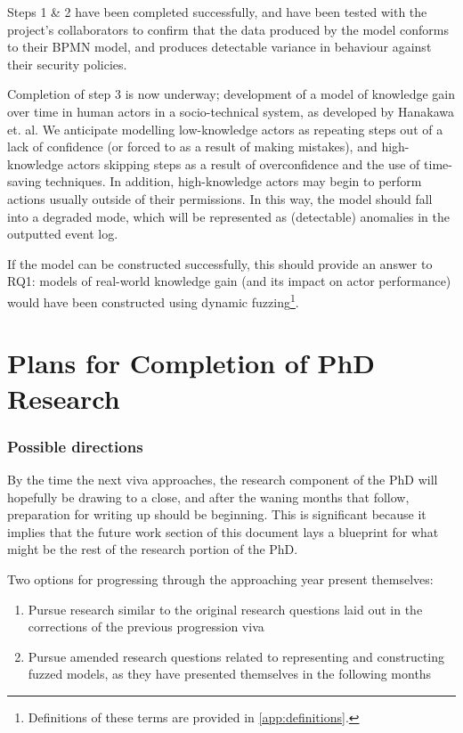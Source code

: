\documentclass[11pt]{article}
\newcommand{\ampersand}{\&}
\begin{document}
Steps 1 \ampersand{} 2 have been completed successfully, and have been tested with the
project's collaborators to confirm that the data produced by the model conforms
to their BPMN model, and produces detectable variance in behaviour against their
security policies.

Completion of step 3 is now underway; development of a model of knowledge gain
over time in human actors in a socio-technical system, as developed by Hanakawa
et. al\cite{hanakawa}. We anticipate modelling low-knowledge actors as repeating
steps out of a lack of confidence (or forced to as a result of making mistakes),
and high-knowledge actors skipping steps as a result of overconfidence and the
use of time-saving techniques. In addition, high-knowledge actors may begin to
perform actions usually outside of their permissions. In this way, the model
should fall into a degraded mode\cite{degraded_modes}, which will be represented
as (detectable) anomalies in the outputted event log.

If the model can be constructed successfully, this should provide an answer to
RQ1: models of real-world knowledge gain (and its impact on actor performance)
would have been constructed using dynamic fuzzing\footnote{Definitions of these terms
are provided in \cref{app:definitions}.}.





\part{Plans for Completion of PhD Research}
\label{part:future_work}

\section{Possible directions}
\label{sec:org34ca36a}

By the time the next viva approaches, the research component of the PhD will
hopefully be drawing to a close, and after the waning months that follow,
preparation for writing up should be beginning. This is significant because it
implies that the future work section of this document lays a blueprint for what
might be the rest of the research portion of the PhD.

Two options for progressing through the approaching year present themselves:

\begin{enumerate}
\item Pursue research similar to the original research questions laid out in the
corrections of the previous progression viva
\item Pursue amended research questions related to representing and constructing
fuzzed models, as they have presented themselves in the following months
\end{enumerate}
\end{document}
